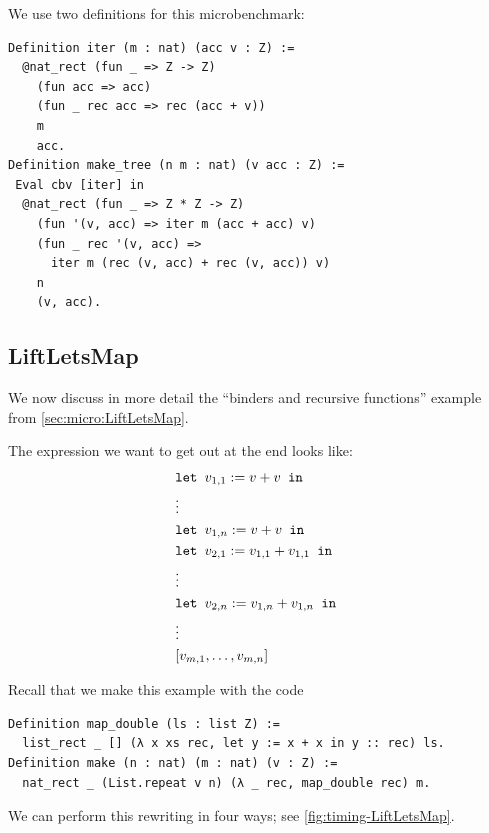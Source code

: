 \begin{subappendices}
We use two definitions for this microbenchmark:
\begin{verbatim}
Definition iter (m : nat) (acc v : Z) :=
  @nat_rect (fun _ => Z -> Z)
    (fun acc => acc)
    (fun _ rec acc => rec (acc + v))
    m
    acc.
Definition make_tree (n m : nat) (v acc : Z) :=
 Eval cbv [iter] in
  @nat_rect (fun _ => Z * Z -> Z)
    (fun '(v, acc) => iter m (acc + acc) v)
    (fun _ rec '(v, acc) =>
      iter m (rec (v, acc) + rec (v, acc)) v)
    n
    (v, acc).
\end{verbatim}

\subsection{LiftLetsMap} \label{sec:LiftLetsMap-more}

We now discuss in more detail the ``binders and recursive functions'' example from \autoref{sec:micro:LiftLetsMap}.

The expression we want to get out at the end looks like:
\begin{align*}
    & \letin[{v_{1,1} := v + v}{}] \\
    & \vdots \\
    & \letin[{v_{1,n} := v + v}{}] \\
    & \letin[{v_{2,1} := v_{1,1} + v_{1,1}}{}] \\
    & \vdots \\
    & \letin[{v_{2,n} := v_{1,n} + v_{1,n}}{}] \\
    & \vdots \\
    & [v_{m,1}, \ldots, v_{m,n}]
\end{align*}

Recall that we make this example with the code
\begin{verbatim}
Definition map_double (ls : list Z) :=
  list_rect _ [] (λ x xs rec, let y := x + x in y :: rec) ls.
Definition make (n : nat) (m : nat) (v : Z) :=
  nat_rect _ (List.repeat v n) (λ _ rec, map_double rec) m.
\end{verbatim}

We can perform this rewriting in four ways; see \autoref{fig:timing-LiftLetsMap}.


\end{subappendices}
